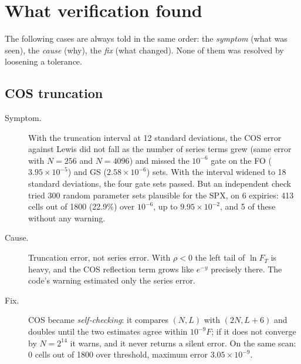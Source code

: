 \section{What verification found}
\label{sec:val-lezioni}
The following cases are always told in the same order: the \emph{symptom} (what was seen), the \emph{cause} (why), the
\emph{fix} (what changed). None of them was resolved by loosening a tolerance.

\subsection{COS truncation}
\begin{description}
\item[Symptom.] With the truncation interval at 12 standard deviations, the COS error against Lewis did not fall as
the number of series terms grew (same error with ${N=256}$ and ${N=4096}$) and missed the $10^{-6}$ gate on the FO
($3.95\times10^{-5}$) and GS ($2.58\times10^{-6}$) sets. With the interval widened to 18 standard deviations, the four
gate sets passed. But an independent check tried 300 random parameter sets plausible for the SPX, on 6 expiries: 413
cells out of 1800 (22.9\%) over $10^{-6}$, up to $9.95\times10^{-2}$, and 5 of these without any warning.
\item[Cause.] Truncation error, not series error. With $\rho<0$ the left tail of $\ln F_T$ is heavy, and the COS
reflection term grows like $e^{-y}$ precisely there. The code's warning estimated only the series error.
\item[Fix.] COS became \emph{self-checking}: it compares $(N,L)$ with $(2N,L+6)$ and doubles until the two estimates
agree within $10^{-9}F$; if it does not converge by $N=2^{14}$ it warns, and it never returns a silent error. On the
same scan: 0 cells out of 1800 over threshold, maximum error $3.05\times10^{-9}$.
\end{description}

